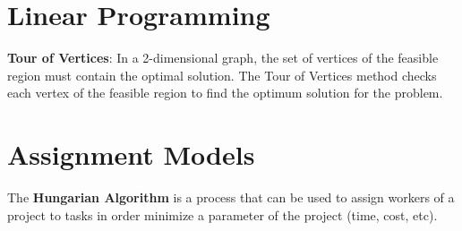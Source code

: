 %
%
%



\section{Linear Programming} \label{Module1:LinearProgramming}

\begin{defn}\label{mod1:defn:TourOfVertices}
	\textbf{Tour of Vertices}: In a 2-dimensional graph, the set of vertices of the feasible region must contain the optimal solution. The Tour of Vertices method checks each vertex of the feasible region to find the optimum solution for the problem.
\end{defn}

\section{Assignment Models} \label{Module1:AsgnmtModels}

\begin{defn} \label{mod1:defn:HungAlg}
	The \textbf{Hungarian Algorithm} is a process that can be used to assign workers of a project to tasks in order minimize a parameter of the project (time, cost, etc).
\end{defn}


